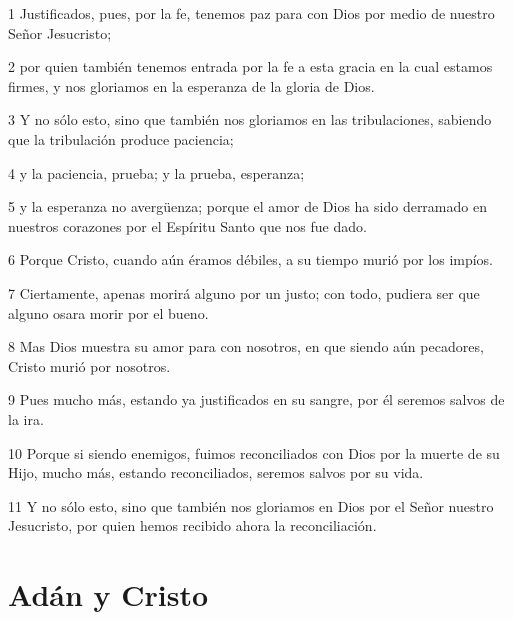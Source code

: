 \par 1 Justificados, pues, por la fe, tenemos paz para con Dios por medio de nuestro Señor Jesucristo;
\par 2 por quien también tenemos entrada por la fe a esta gracia en la cual estamos firmes, y nos gloriamos en la esperanza de la gloria de Dios.
\par 3 Y no sólo esto, sino que también nos gloriamos en las tribulaciones, sabiendo que la tribulación produce paciencia;
\par 4 y la paciencia, prueba; y la prueba, esperanza;
\par 5 y la esperanza no avergüenza; porque el amor de Dios ha sido derramado en nuestros corazones por el Espíritu Santo que nos fue dado.
\par 6 Porque Cristo, cuando aún éramos débiles, a su tiempo murió por los impíos.
\par 7 Ciertamente, apenas morirá alguno por un justo; con todo, pudiera ser que alguno osara morir por el bueno.
\par 8 Mas Dios muestra su amor para con nosotros, en que siendo aún pecadores, Cristo murió por nosotros.
\par 9 Pues mucho más, estando ya justificados en su sangre, por él seremos salvos de la ira.
\par 10 Porque si siendo enemigos, fuimos reconciliados con Dios por la muerte de su Hijo, mucho más, estando reconciliados, seremos salvos por su vida.
\par 11 Y no sólo esto, sino que también nos gloriamos en Dios por el Señor nuestro Jesucristo, por quien hemos recibido ahora la reconciliación.

\section*{Adán y Cristo}

